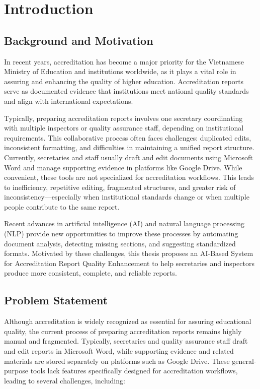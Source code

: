 \chapter{Introduction}

\section{Background and Motivation}
In recent years, accreditation has become a major priority for the Vietnamese Ministry of Education and institutions worldwide, as it plays a vital role in assuring and enhancing the quality of higher education. Accreditation reports serve as documented evidence that institutions meet national quality standards and align with international expectations.

Typically, preparing accreditation reports involves one secretary coordinating with multiple inspectors or quality assurance staff, depending on institutional requirements. This collaborative process often faces challenges: duplicated edits, inconsistent formatting, and difficulties in maintaining a unified report structure. Currently, secretaries and staff usually draft and edit documents using Microsoft Word and manage supporting evidence in platforms like Google Drive. While convenient, these tools are not specialized for accreditation workflows. This leads to inefficiency, repetitive editing, fragmented structures, and greater risk of inconsistency—especially when institutional standards change or when multiple people contribute to the same report.

Recent advances in artificial intelligence (AI) and natural language processing (NLP) provide new opportunities to improve these processes by automating document analysis, detecting missing sections, and suggesting standardized formats. Motivated by these challenges, this thesis proposes an AI-Based System for Accreditation Report Quality Enhancement to help secretaries and inspectors produce more consistent, complete, and reliable reports.

\section{Problem Statement}

Although accreditation is widely recognized as essential for assuring educational quality, the current process of preparing accreditation reports remains highly manual and fragmented. Typically, secretaries and quality assurance staff draft and edit reports in Microsoft Word, while supporting evidence and related materials are stored separately on platforms such as Google Drive. These general-purpose tools lack features specifically designed for accreditation workflows, leading to several challenges, including:

